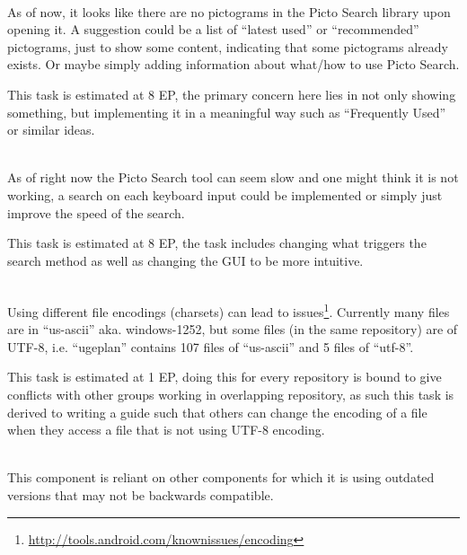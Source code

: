 \begin{description}[style=unboxed]
    \item[{[}\phigh{]} Picto Search --- It looks like there are no pictograms, until you search for them] \hfill \\ 
        As of now, it looks like there are no pictograms in the Picto Search library upon opening it. 
        A suggestion could be a list of ``latest used'' or ``recommended'' pictograms, just to show some content, indicating that some pictograms already exists.
        Or maybe simply adding information about what/how to use Picto Search.

        This task is estimated at 8 EP, the primary concern here lies in not only showing something, but implementing it in a meaningful way such as ``Frequently Used'' or similar ideas.
    \item[{[}\phigh{]} Picto Search --- Responsive Search] \hfill \\
        As of right now the Picto Search tool can seem slow and one might think it is not working, a search on each keyboard input could be implemented or simply just improve the speed of the search.

        This task is estimated at 8 EP, the task includes changing what triggers the search method as well as changing the GUI to be more intuitive.
    \item[{[}\phigh{]} General --- Use consistent file encoding] \hfill \\
        Using different file encodings (charsets) can lead to issues\footnote{\url{http://tools.android.com/knownissues/encoding}}. 
        Currently many files are in ``us-ascii'' aka. windows-1252, but some files (in the same repository) are of UTF-8, i.e. ``ugeplan'' contains 107 files of ``us-ascii'' and 5 files of ``utf-8''.    

        This task is estimated at 1 EP, doing this for every repository is bound to give conflicts with other groups working in overlapping repository, as such this task is derived to writing a guide such that others can change the encoding of a file when they access a file that is not using UTF-8 encoding.
    \item[{[}\phigh{]} SequenceViewer --- Update dependencies] \hfill \\
        This component is reliant on other components for which it is using outdated versions that may not be backwards compatible.


\end{description}
